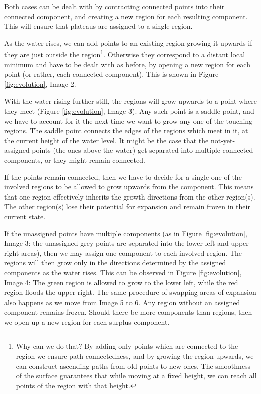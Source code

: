 \documentclass[a4paper,12pt,notitlepage,fullpage]{paper}
\theoremstyle{plain}
\theoremstyle{definition}
\begin{document}
Both cases can be dealt with by contracting connected points into their connected component, and creating a new region for each resulting component. This will ensure that plateaus are assigned to a single region.

As the water rises, we can add points to an existing region growing it upwards if they are just outside the region\footnote{Why can we do that?
By adding only points which are connected to the region we ensure path-connectedness, and by growing the region upwards, we can construct ascending paths from old points to new ones.
The smoothness of the surface guarantees that while moving at a fixed height, we can reach all points of the region with that height.}. Otherwise they correspond to a distant local minimum and have to be dealt with as before, by opening a new region for each point (or rather, each connected component). This is shown in Figure \ref{fig:evolution}, Image 2.

With the water rising further still, the regions will grow upwards to a point where they meet (Figure \ref{fig:evolution}, Image 3). Any such point is a saddle point, and we have to account for it the next time we want to grow any one of the touching regions. The saddle point connects the edges of the regions which meet in it, at the current height of the water level. It might be the case that the not-yet-assigned points (the ones above the water) get separated into multiple connected components, or they might remain connected.

If the points remain connected, then we have to decide for a single one of the involved regions to be allowed to grow upwards from the component. This means that one region effectively inherits the growth directions from the other region(s). The other region(s) lose their potential for expansion and remain frozen in their current state.

If the unassigned points have multiple components (as in Figure \ref{fig:evolution}, Image 3: the unassigned grey points are separated into the lower left and upper right areas), then we may assign one component to each involved region. The regions will then grow only in the directions determined by the assigned components as the water rises. This can be observed in Figure \ref{fig:evolution}, Image 4: The green region is allowed to grow to the lower left, while the red region floods the upper right. The same procedure of swapping areas of expansion also happens as we move from Image 5 to 6. Any region without an assigned component remains frozen. Should there be more components than regions, then we open up a new region for each surplus component.
\end{document}
